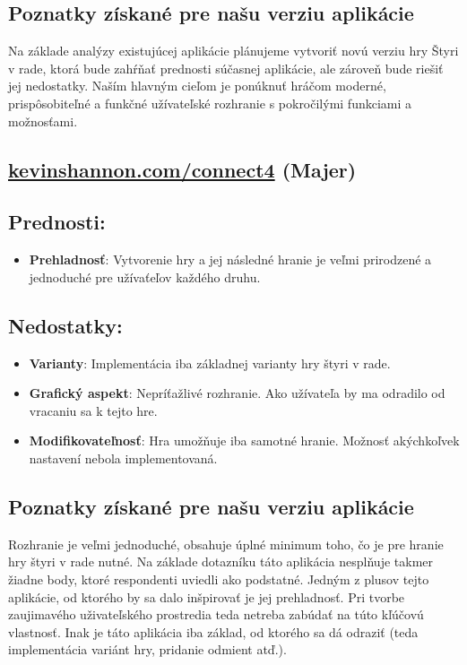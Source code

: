 \documentclass[a4paper, 11pt, onecolumn]{article}
\begin{document}
\subsection*{Poznatky získané pre našu verziu aplikácie}

Na základe analýzy existujúcej aplikácie plánujeme vytvoriť novú verziu hry 
Štyri v rade, ktorá bude zahŕňať prednosti súčasnej aplikácie, ale zároveň 
bude riešiť jej nedostatky. Naším hlavným cieľom je ponúknuť hráčom moderné, 
prispôsobiteľné a funkčné užívateľské rozhranie s pokročilými funkciami 
a možnosťami.
\subsection{ \href{https://kevinshannon.com/connect4/}{kevinshannon.com/connect4} (Majer)}
\subsection*{Prednosti:}
\begin{itemize}
  \item \textbf{Prehladnosť}: Vytvorenie hry a jej následné hranie je veľmi prirodzené a jednoduché pre užívaťeľov každého druhu.
\end{itemize}
\subsection*{Nedostatky:}
\begin{itemize}
  \item \textbf{Varianty}: Implementácia iba základnej varianty hry štyri v rade.
  \item \textbf{Grafický aspekt}: Nepríťažlivé rozhranie. Ako užívateľa by ma odradilo od vracaniu sa k tejto hre.
  \item \textbf{Modifikovateľnosť}: Hra umožňuje iba samotné hranie. Možnosť akýchkoľvek nastavení nebola implementovaná.
\end{itemize}
\subsection*{Poznatky získané pre našu verziu aplikácie}
Rozhranie je veľmi jednoduché, obsahuje úplné minimum toho, čo je pre hranie hry štyri v rade nutné. Na základe dotazníku táto
aplikácia nesplňuje takmer žiadne body, ktoré respondenti uviedli ako podstatné. Jedným z plusov tejto aplikácie, od ktorého by
sa dalo inšpirovať je jej prehladnosť. Pri tvorbe zaujimavého uživateľského prostredia teda netreba zabúdať na túto kľúčovú
vlastnosť. Inak je táto aplikácia iba základ, od ktorého sa dá odraziť (teda implementácia variánt hry, pridanie odmient atď.).
\end{document}
